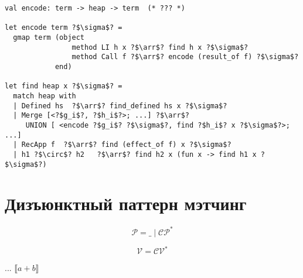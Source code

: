 \documentclass[a5paper,12pt]{article}
\newcommand*{\arr}{\ensuremath{\rightarrow}}
\begin{document}
\begin{verbatim}  
val encode: term -> heap -> term  (* ??? *)

let encode term ?$\sigma$? = 
  gmap term (object 
                method LI h x ?$\arr$? find h x ?$\sigma$? 
                method Call f ?$\arr$? encode (result_of f) ?$\sigma$? 
            end)

let find heap x ?$\sigma$? =
  match heap with 
  | Defined hs  ?$\arr$? find_defined hs x ?$\sigma$? 
  | Merge [<?$g_i$?, ?$h_i$?>; ...] ?$\arr$? 
     UNION [ <encode ?$g_i$? ?$\sigma$?, find ?$h_i$? x ?$\sigma$?>; ...]
  | RecApp f  ?$\arr$? find (effect_of f) x ?$\sigma$?
  | h1 ?$\circ$? h2   ?$\arr$? find h2 x (fun x -> find h1 x ?$\sigma$?)
\end{verbatim}

\section{Дизъюнктный паттерн мэтчинг}

$$
\mathcal{P = \_ \mid CP^*}
$$

$$
\mathcal{V = CV^*}
$$

...
$\llbracket a+b\rrbracket$
\end{document}
